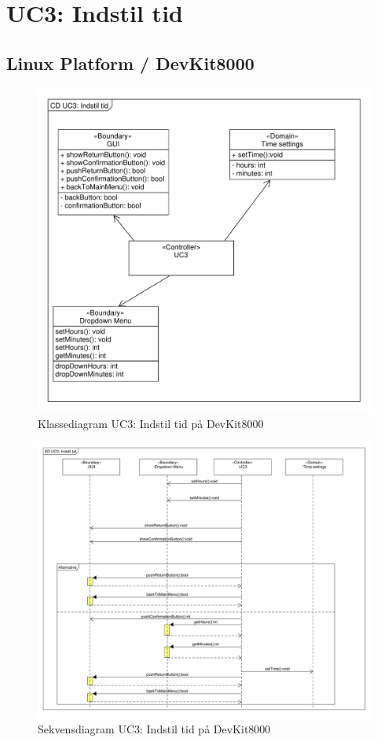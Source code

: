 \section{UC3: Indstil tid}

\subsection{Linux Platform / DevKit8000}
\begin{figure}[H]
	\caption{Klassediagram UC3: Indstil tid på DevKit8000}
	\label{CD:UC3-devkit}
	\includegraphics[scale=0.6,trim=10 800 100 0]{Applikationsmodel_UC3/cd_UC3.pdf}
\end{figure}

\begin{figure}[H]
	\caption{Sekvensdiagram UC3: Indstil tid på DevKit8000}
	\label{SD:UC3-devkit}
	\includegraphics[scale=0.6,trim=10 400 100 0]{Applikationsmodel_UC3/SD_UC3.pdf}
\end{figure}
